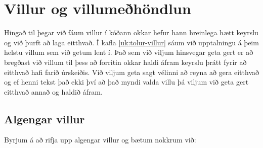 
\chapter{Villur og villumeðhöndlun}\label{k:villur}
Hingað til þegar við fáum villur í kóðann okkar hefur hann hreinlega hætt keyrslu og við þurft að laga eitthvað.
Í kafla \ref{uk:tolur-villur} sáum við upptalningu á þeim helstu villum sem við getum lent í.
Það sem við viljum hinsvegar geta gert er að bregðast við villum til þess að forritin okkar haldi áfram keyrslu þrátt fyrir að eitthvað hafi farið úrskeiðis.
Við viljum geta sagt vélinni að reyna að gera eitthvað og ef henni tekst það ekki því að það myndi valda villu þá viljum við geta gert eitthvað annað og haldið áfram.

\section{Algengar villur}\label{uk:villur-algengar}
Byrjum á að rifja upp algengar villur og bætum nokkrum við:


